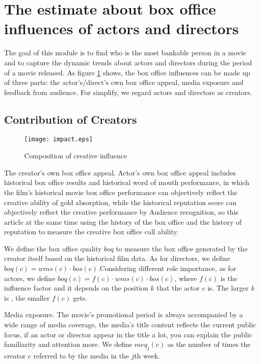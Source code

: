 \section{The estimate about box office influences of actors and directors}
\label{sec:impact}
\par The goal of this module is to find who is the most bankable person in a movie and to capture the dynamic trends about actors and directors during the period of a movie released. As figure \ref{fig:influ} shows, the box office influences can be made up of three parts: the actor's/direct's own box office appeal, media exposure and feedback from audience. For simplify, we regard actors and directors as creators.\\

\subsection{Contribution of Creators}
\begin{figure}[!htbp]
\centering
\texttt{[image: impact.eps]}
\caption{Composition of creative influence}
\label{fig:influ}
\end{figure}
\par The creator's own box office appeal. Actor's own box office appeal includes historical box office results and historical word of mouth performance, in which the film's historical movie box office performance can objectively reflect the creative ability of gold absorption, while the historical reputation score can objectively reflect the creative performance by Audience recognition, so this article at the same time using the history of the box office and the history of reputation to measure the creative box office call ability.\\
\par We define the box office quality $boq$ to measure the box office generated by the creator itself based on the historical film data. 
As for directors, we define $boq(c)=wms(c)\cdot bos(c)$.Considering different role importance, as for actors, we define $boq(c) = f(c)\cdot wms(c)\cdot bos(c)$, where $f(c)$ is the influence factor and it depends on the position $k$ that the actor $c$ is. The larger $k$ is , the smaller $f(c)$ gets.\\
\par Media exposure. The movie's promotional period is always accompanied by a wide range of media coverage, the media's title content reflects the current public focus, if an actor or director appear in the title a lot, you can explain the public familiarity and attention more. We define $meq_j(c)$ as the number of times the creator $c$ referred to by the media in the $j$th week.\\
